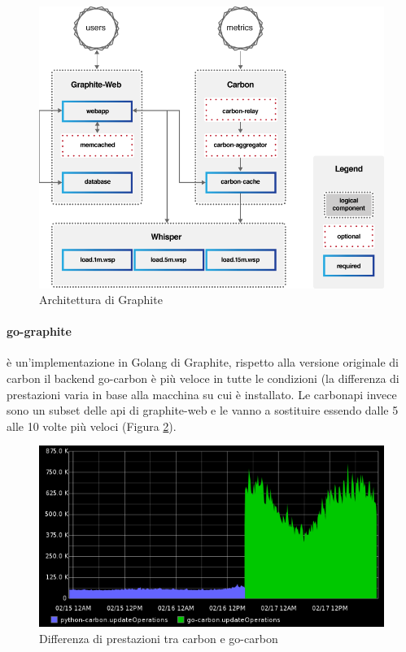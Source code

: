 \begin{figure}[h]
    \includegraphics[width=\hsize]{images/my_work/graphite.png}
    \caption{Architettura di Graphite}
    \label{fig:graphite}
    \centering
\end{figure}

\paragraph{go-graphite} è un'implementazione in Golang di Graphite, rispetto alla versione originale di carbon il backend
go-carbon è più veloce in tutte le condizioni (la differenza di prestazioni varia in base alla macchina su cui è installato.
Le carbonapi invece sono un subset delle api di graphite-web e le vanno a sostituire essendo dalle 5 alle 10 volte più veloci (Figura \ref{fig:gocarbon}).

\begin{figure}[h]
    \includegraphics[width=\hsize]{images/my_work/go-carbon.png}
    \caption{Differenza di prestazioni tra carbon e go-carbon}
    \label{fig:gocarbon}
    \centering
\end{figure}


